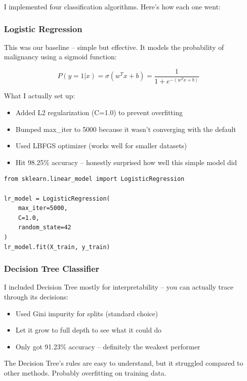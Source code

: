 \documentclass[12pt]{article}
\begin{document}
I implemented four classification algorithms. Here's how each one went:

\subsubsection{Logistic Regression}
This was our baseline -- simple but effective. It models the probability of malignancy using a sigmoid function:

\begin{equation}
P(y=1|x) = \sigma(w^T x + b) = \frac{1}{1 + e^{-(w^T x + b)}}
\end{equation}

What I actually set up:
\begin{itemize}
    \item Added L2 regularization (C=1.0) to prevent overfitting
    \item Bumped max\_iter to 5000 because it wasn't converging with the default
    \item Used LBFGS optimizer (works well for smaller datasets)
    \item Hit 98.25\% accuracy -- honestly surprised how well this simple model did
\end{itemize}

\begin{lstlisting}[style=pythonstyle, caption={Logistic Regression Implementation}]
from sklearn.linear_model import LogisticRegression

lr_model = LogisticRegression(
    max_iter=5000,
    C=1.0,
    random_state=42
)
lr_model.fit(X_train, y_train)
\end{lstlisting}

\subsubsection{Decision Tree Classifier}
I included Decision Tree mostly for interpretability -- you can actually trace through its decisions:

\begin{itemize}
    \item Used Gini impurity for splits (standard choice)
    \item Let it grow to full depth to see what it could do
    \item Only got 91.23\% accuracy -- definitely the weakest performer
\end{itemize}

The Decision Tree's rules are easy to understand, but it struggled compared to other methods. Probably overfitting on training data.
\end{document}
